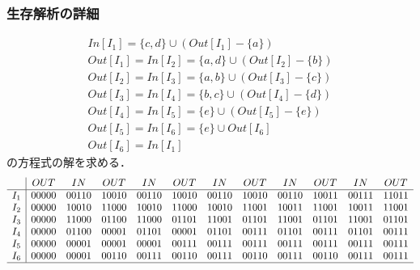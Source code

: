 \documentclass[ckj,dvipdfmx]{beamer}
\begin{document}
\begin{frame}
  \frametitle{生存解析の詳細}
  \[\begin{array}{l}
    In[I_1]=\{c,d\}\cup(Out[I_1]-\{a\})\\
    Out[I_1]=In[I_2]=\{a,d\}\cup(Out[I_2]-\{b\})\\
    Out[I_2]=In[I_3]=\{a,b\}\cup(Out[I_3]-\{c\})\\
    Out[I_3]=In[I_4]=\{b,c\}\cup(Out[I_4]-\{d\})\\
    Out[I_4]=In[I_5]=\{e\}\cup(Out[I_5]-\{e\})\\
    Out[I_5]=In[I_6]=\{e\}\cup Out[I_6]\\
    Out[I_6]=In[I_1]
  \end{array}
    \]
  の方程式の解を求める．
  {\tiny
  \[\begin{array}{c|ccccccccccc}
    & OUT & IN & OUT & IN & OUT & IN & OUT & IN & OUT & IN & OUT\\\hline
  I_1 & 00000 & 00110 & 10010 & 00110 & 10010 & 00110 & 10010 & 00110 & 10011 & 00111 & 11011\\
  I_2 & 00000 & 10010 & 11000 & 10010 & 11000 & 10010 & 11001 & 10011 & 11001 & 10011 & 11001\\
  I_3 & 00000 & 11000 & 01100 & 11000 & 01101 & 11001 & 01101 & 11001 & 01101 & 11001 & 01101\\
  I_4 & 00000 & 01100 & 00001 & 01101 & 00001 & 01101 & 00111 & 01101 & 00111 & 01101 & 00111\\
  I_5 & 00000 & 00001 & 00001 & 00001 & 00111 & 00111 & 00111 & 00111 & 00111 & 00111 & 00111\\
  I_6 & 00000 & 00001 & 00110 & 00111 & 00110 & 00111 & 00110 & 00111 & 00110 & 00111 & 00111\\\hline
  \end{array}
    \]
  }
\end{frame}
\end{document}
